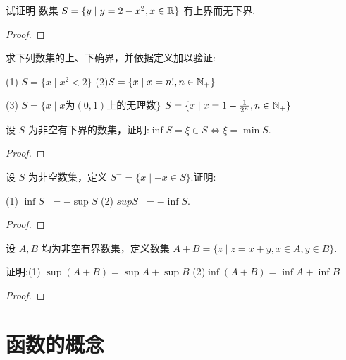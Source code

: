 \begin{practice}
    试证明 数集 $S=\{y\mid y=2-x^2,x\in \mathbb{R}\}$ 有上界而无下界.
\end{practice}

\begin{proof}
    
\end{proof}

\begin{practice}
    求下列数集的上、下确界，并依据定义加以验证:

    (1) $S=\{x\mid x^2<2\}$ \qquad (2)$S=\{x \mid x=n!,n\in \mathbb{N}_+ \}$

    (3) $S=\{ x\mid x\mbox{为} (0,1) \mbox{上的无理数} \}$ \qquad $S=\{ x \mid x=1-\frac{1}{2^n},n\in \mathbb{N}_+\}$
\end{practice}

\begin{solve}
    
\end{solve}

\begin{practice}
    设 $S$ 为非空有下界的数集，证明:$\inf S=\xi \in S \iff \xi =\min S$.
\end{practice}

\begin{proof}
    
\end{proof}

\begin{practice}
    设 $S$ 为非空数集，定义 $S^-=\{ x\mid -x \in S\}$.证明:

    (1) $\inf S^-=-\sup S$ \qquad (2) $sup S^- = -\inf S$.
\end{practice}

\begin{proof}
    
\end{proof}

\begin{practice}
    设 $A,B$ 均为非空有界数集，定义数集 $A+B=\{z\mid z=x+y,x\in A,y\in B\}$.

    证明:(1) $\sup (A+B) = \sup A+\sup B$ 
    \qquad (2)$\inf (A+B) = \inf A+\inf B$ 
\end{practice}

\begin{proof}
    
\end{proof}

\newsection

\section{函数的概念}